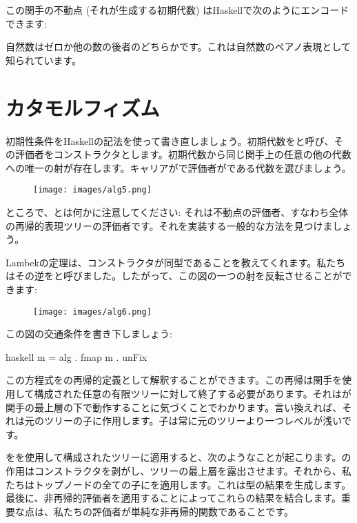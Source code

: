 この関手の不動点 (それが生成する初期代数) はHaskellで次のようにエンコードできます: 

自然数はゼロか他の数の後者のどちらかです。これは自然数のペアノ表現として知られています。

\section{カタモルフィズム}

初期性条件をHaskellの記法を使って書き直しましょう。初期代数をと呼び、その評価者をコンストラクタとします。初期代数から同じ関手上の任意の他の代数への唯一の射が存在します。キャリアがで評価者がである代数を選びましょう。

\begin{figure}[H]
  \centering
  \texttt{[image: images/alg5.png]}
\end{figure}

\noindent
ところで、とは何かに注意してください: それは不動点の評価者、すなわち全体の再帰的表現ツリーの評価者です。それを実装する一般的な方法を見つけましょう。

Lambekの定理は、コンストラクタが同型であることを教えてくれます。私たちはその逆をと呼びました。したがって、この図の一つの射を反転させることができます: 

\begin{figure}[H]
  \centering
  \texttt{[image: images/alg6.png]}
\end{figure}

\noindent
この図の交通条件を書き下しましょう: 

\begin{snip}{haskell}
m = alg . fmap m . unFix
\end{snip}
この方程式をの再帰的定義として解釈することができます。この再帰は関手を使用して構成された任意の有限ツリーに対して終了する必要があります。それはが関手の最上層の下で動作することに気づくことでわかります。言い換えれば、それは元のツリーの子に作用します。子は常に元のツリーより一つレベルが浅いです。

をを使用して構成されたツリーに適用すると、次のようなことが起こります。の作用はコンストラクタを剥がし、ツリーの最上層を露出させます。それから、私たちはトップノードの全ての子にを適用します。これは型の結果を生成します。最後に、非再帰的評価者を適用することによってこれらの結果を結合します。重要な点は、私たちの評価者が単純な非再帰的関数であることです。

